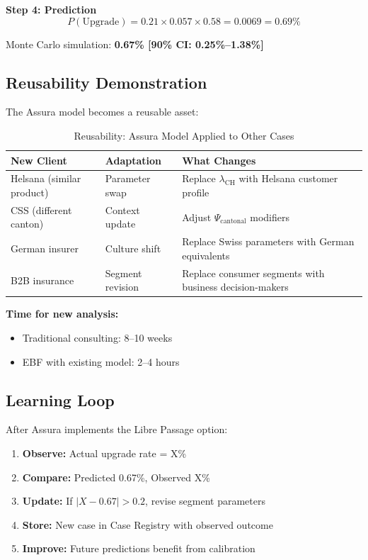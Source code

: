 \textbf{Step 4: Prediction}
\begin{equation}
P(\text{Upgrade}) = 0.21 \times 0.057 \times 0.58 = 0.0069 = 0.69\%
\end{equation}

Monte Carlo simulation: \textbf{0.67\% [90\% CI: 0.25\%--1.38\%]}

\subsection{Reusability Demonstration}

The Assura model becomes a reusable asset:

\begin{table}[htbp]
\centering
\caption{Reusability: Assura Model Applied to Other Cases}
\label{tab:fm-reusability}
\renewcommand{\arraystretch}{1.3}
\begin{tabular}{@{}p{3.5cm}p{3cm}p{6cm}@{}}
\toprule
\textbf{New Client} & \textbf{Adaptation} & \textbf{What Changes} \\
\midrule
Helsana (similar product) & Parameter swap & Replace $\lambda_{\text{CH}}$ with Helsana customer profile \\
CSS (different canton) & Context update & Adjust $\Psi_{\text{cantonal}}$ modifiers \\
German insurer & Culture shift & Replace Swiss parameters with German equivalents \\
B2B insurance & Segment revision & Replace consumer segments with business decision-makers \\
\bottomrule
\end{tabular}
\end{table}

\textbf{Time for new analysis:}
\begin{itemize}[nosep]
    \item Traditional consulting: 8--10 weeks
    \item EBF with existing model: 2--4 hours
\end{itemize}

\subsection{Learning Loop}

After Assura implements the Libre Passage option:
\begin{enumerate}
    \item \textbf{Observe:} Actual upgrade rate = X\%
    \item \textbf{Compare:} Predicted 0.67\%, Observed X\%
    \item \textbf{Update:} If $|X - 0.67| > 0.2$, revise segment parameters
    \item \textbf{Store:} New case in Case Registry with observed outcome
    \item \textbf{Improve:} Future predictions benefit from calibration
\end{enumerate}


